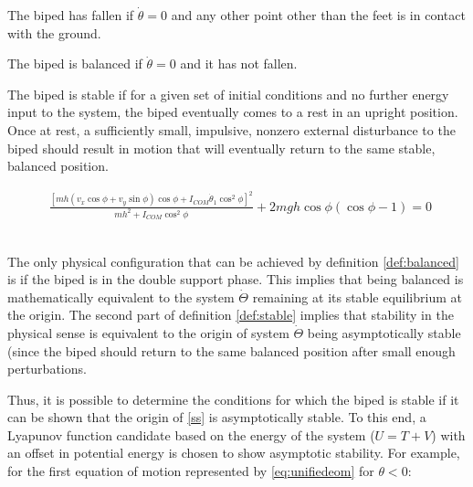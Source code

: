 \hrulefill

\begin{definition} \label{def:fallen}
	The biped has fallen if $\dot{\theta} = 0$ and any other point other than the feet is in contact with the ground. 
\end{definition}

\begin{definition} \label{def:balanced}
	The biped is balanced if $\dot{\theta} = 0$ and it has not fallen. 
\end{definition}

\begin{definition} \label{def:stable}
	The biped is stable if for a given set of initial conditions and no further energy input to the system, the biped eventually comes to a rest in an upright position. Once at rest, a sufficiently small, impulsive, nonzero external disturbance to the biped should result in motion that will eventually return to the same stable, balanced position. 
\end{definition}

\hrulefill

\begin{figure}[!t]
	\begin{equation} \label{eq:fpe}
	\begin{aligned}
		\frac{{{{\left[ {mh({v_x}\cos \phi  + {v_y}\sin \phi )\cos \phi  + {I_{COM}}{{\dot \theta }_1}{{\cos }^2}\phi } \right]}^2}}}{{m{h^2} + {I_{COM}}{{\cos }^2}\phi }} + 2mgh\cos \phi (\cos \phi  - 1) = 0
	\end{aligned}
	\end{equation}
	\\ 
	\hrulefill
\end{figure}

The only physical configuration that can be achieved by definition \ref{def:balanced} is if the biped is in the double support phase. This implies that being balanced is mathematically equivalent to the system $\dot{\Theta}$ remaining at its stable equilibrium at the origin. The second part of definition \ref{def:stable} implies that stability in the physical sense is equivalent to the origin of system $\dot{\Theta}$ being asymptotically stable (since the biped should return to the same balanced position after small enough perturbations.

Thus, it is possible to determine the conditions for which the biped is stable if it can be shown that the origin of \eqref{ss} is asymptotically stable. To this end, a Lyapunov function candidate based on the energy of the system ($U = T + V$) with an offset in potential energy is chosen to show asymptotic stability. For example, for the first equation of motion represented by \eqref{eq:unifiedeom} for $\theta < 0$: 

